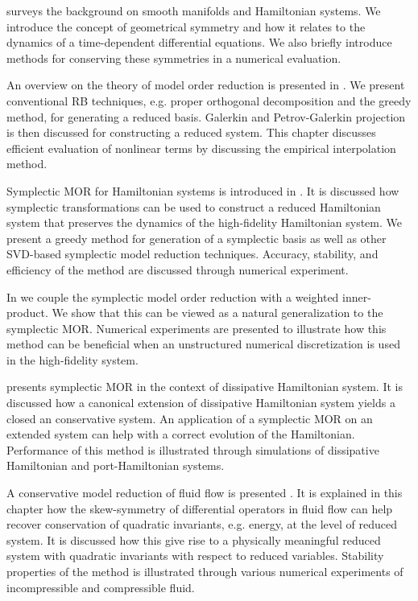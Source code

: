  surveys the background on smooth manifolds and Hamiltonian systems. We introduce the concept of geometrical symmetry and how it relates to the dynamics of a time-dependent differential equations. We also briefly introduce methods for conserving these symmetries in a numerical evaluation.

An overview on the theory of model order reduction is presented in . We present conventional RB techniques, e.g. proper orthogonal decomposition and the greedy method, for generating a reduced basis. Galerkin and Petrov-Galerkin projection is then discussed for constructing a reduced system. This chapter discusses efficient evaluation of nonlinear terms by discussing the empirical interpolation method.

Symplectic MOR for Hamiltonian systems is introduced in . It is discussed how symplectic transformations can be used to construct a reduced Hamiltonian system that preserves the dynamics of the high-fidelity Hamiltonian system. We present a greedy method for generation of a symplectic basis as well as other SVD-based symplectic model reduction techniques. Accuracy, stability, and efficiency of the method are discussed through numerical experiment.

In  we couple the symplectic model order reduction with a weighted inner-product. We show that this can be viewed as a natural generalization to the symplectic MOR. Numerical experiments are presented to illustrate how this method can be beneficial when an unstructured numerical discretization is used in the high-fidelity system.

 presents symplectic MOR in the context of dissipative Hamiltonian system. It is discussed how a canonical extension of dissipative Hamiltonian system yields a closed an conservative system. An application of a symplectic MOR on an extended system can help with a correct evolution of the Hamiltonian. Performance of this method is illustrated through simulations of dissipative Hamiltonian and port-Hamiltonian systems.

A conservative model reduction of fluid flow is presented . It is explained in this chapter how the skew-symmetry of differential operators in fluid flow can help recover conservation of quadratic invariants, e.g. energy, at the level of reduced system. It is discussed how this give rise to a physically meaningful reduced system with quadratic invariants with respect to reduced variables. Stability properties of the method is illustrated through various numerical experiments of incompressible and compressible fluid.

\lipsum[1]
